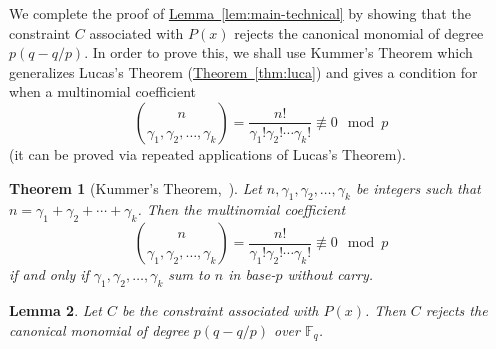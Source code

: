 \documentclass[10pt]{article}
\newtheorem{theorem}{Theorem}[section]
\newtheorem{lemma}[theorem]{Lemma}
\theoremstyle{definition}
\numberwithin{equation}{section}
\newcommand{\expref}[2]{\texorpdfstring{\hyperref[#2]{#1~\ref{#2}}}{#1~\ref{#2}}}
\newcommand{\F}{{\mathbb{F}}}
\begin{document}
We complete the proof of \expref{Lemma}{lem:main-technical} by showing that the constraint $C$ associated with $P(x)$ rejects the canonical
monomial of degree $p(q-q/p)$. In order to prove this, we shall use Kummer's Theorem which generalizes Lucas's Theorem (\expref{Theorem}{thm:luca}) and
gives a condition for when a multinomial coefficient
\[
\binom  {n}  {\gamma_1, \gamma_2,\ldots, \gamma_k} =
\frac {n!} {\gamma_1! \gamma_2! \cdots \gamma_k!} \not \equiv 0 \mod
p
\]
(it can be proved via repeated applications of Lucas's Theorem).


\begin{theorem}[Kummer's Theorem,~\cite{Kum}]
Let $n, \gamma_1,\gamma_2,\ldots,\gamma_k$ be integers such that $n = \gamma_1 + \gamma_2 + \cdots + \gamma_k$.
Then the multinomial coefficient 
\[
\binom {n}  {\gamma_1, \gamma_2,\ldots, \gamma_k} =
\frac {n!} {\gamma_1! \gamma_2 ! \cdots \gamma_k!} \not \equiv 0 \mod
p
\]
if and only if $\gamma_1, \gamma_2 , \ldots, \gamma_k$ sum
to $n$ in base-$p$ without carry.
\end{theorem}

\begin{lemma}\label{lem:tech-lem-reject}
Let $C$ be the constraint associated with $P(x)$. Then $C$ rejects the canonical monomial of degree $p(q-q/p)$ over $\F_q$.
\end{lemma}
\end{document}
